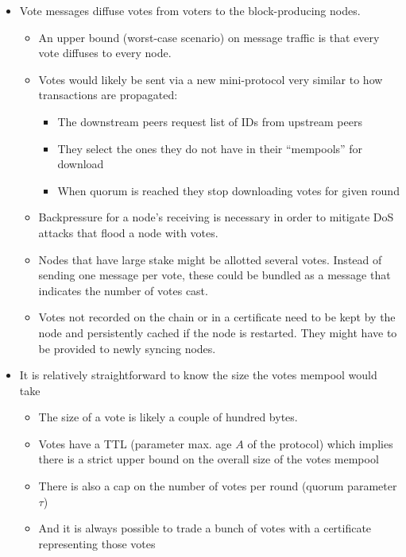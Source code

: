 \documentclass[10pt]{article}
\providecommand{\tightlist}{%
  \setlength{\itemsep}{0pt}\setlength{\parskip}{0pt}}
\begin{document}
\begin{itemize}
\tightlist
\item
  Vote messages diffuse votes from voters to the block-producing nodes.

  \begin{itemize}
  \tightlist
  \item
    An upper bound (worst-case scenario) on message traffic is that
    every vote diffuses to every node.
  \item
    Votes would likely be sent via a new mini-protocol very similar to
    how transactions are propagated:

    \begin{itemize}
    \tightlist
    \item
      The downstream peers request list of IDs from upstream peers
    \item
      They select the ones they do not have in their ``mempools'' for
      download
    \item
      When quorum is reached they stop downloading votes for given round
    \end{itemize}
  \item
    Backpressure for a node's receiving is necessary in order to
    mitigate DoS attacks that flood a node with votes.
  \item
    Nodes that have large stake might be allotted several votes. Instead
    of sending one message per vote, these could be bundled as a message
    that indicates the number of votes cast.
  \item
    Votes not recorded on the chain or in a certificate need to be kept
    by the node and persistently cached if the node is restarted. They
    might have to be provided to newly syncing nodes.
  \end{itemize}
\item
  It is relatively straightforward to know the size the votes mempool
  would take

  \begin{itemize}
  \tightlist
  \item
    The size of a vote is likely a couple of hundred bytes.
  \item
    Votes have a TTL (parameter max. age \(A\) of the protocol) which
    implies there is a strict upper bound on the overall size of the
    votes mempool
  \item
    There is also a cap on the number of votes per round (quorum
    parameter \(\tau\))
  \item
    And it is always possible to trade a bunch of votes with a
    certificate representing those votes
  \end{itemize}
\end{itemize}
\end{document}
